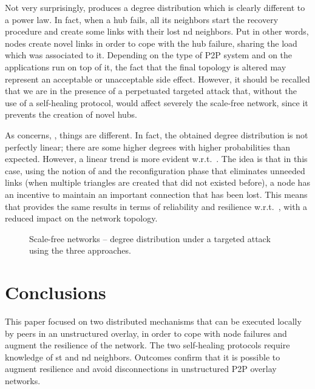 \documentclass[10pt, conference, compsocconf]{IEEEtran}
\begin{document}
Not very surprisingly,  produces a degree distribution which is clearly different to a power law. In fact, when a hub fails, all its neighbors start the recovery procedure and create some links with their lost nd neighbors. Put in other words, nodes create novel links in order to cope with the hub failure, sharing the load which was associated to it.
Depending on the type of P2P system and on the applications run on top of it, the fact that the final topology is altered may represent an acceptable or unacceptable side effect. However, it should be recalled that we are in the presence of a perpetuated targeted attack that, without the use of a self-healing protocol, would affect severely the scale-free network, since it prevents the creation of novel hubs.

As concerns, , things are different. In fact, the obtained degree distribution is not perfectly linear; there are some higher degrees with higher probabilities than expected. However, a linear trend is more evident w.r.t.~. The idea is that in this case, using the notion of  and the reconfiguration phase that eliminates unneeded links (when multiple triangles are created that did not existed before), a node has an incentive to maintain an important connection that has been lost.
This means that  provides the same results in terms of reliability and resilience w.r.t.~, with a reduced impact on the network topology.

\begin{figure*}[t]
   \centering
   \hspace{1.5cm}
   \hspace{1.5cm}
   \caption{Scale-free networks -- degree distribution under a targeted attack using the three approaches.}
   \label{fig:sf_deg_dist}
\end{figure*}



\section{Conclusions}\label{sec:conc}

This paper focused on two distributed mechanisms that can be executed locally by peers in an unstructured overlay, in order to cope with node failures and augment the resilience of the network.
The two self-healing protocols require knowledge of st and nd neighbors. 
Outcomes confirm that it is possible to augment resilience and avoid disconnections in unstructured P2P overlay networks. 
\end{document}
